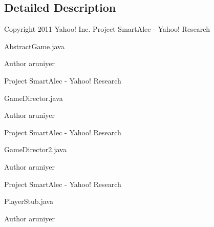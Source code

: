 \subsection{Detailed Description}
Copyright 2011 Yahoo! Inc. Project SmartAlec -\/ Yahoo! Research

AbstractGame.java

\begin{DoxyAuthor}{Author}
aruniyer
\end{DoxyAuthor}
Project SmartAlec -\/ Yahoo! Research

GameDirector.java

\begin{DoxyAuthor}{Author}
aruniyer
\end{DoxyAuthor}
Project SmartAlec -\/ Yahoo! Research

GameDirector2.java

\begin{DoxyAuthor}{Author}
aruniyer
\end{DoxyAuthor}
Project SmartAlec -\/ Yahoo! Research

PlayerStub.java

\begin{DoxyAuthor}{Author}
aruniyer 
\end{DoxyAuthor}
